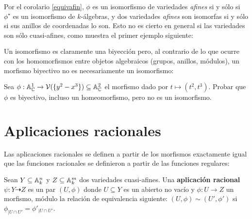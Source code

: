 \documentclass[ACGA.tex]{subfiles}
\begin{document}
 Por el corolario \ref{equivafin}, $\phi$ es un isomorfismo de variedades \emph{afines} si y sólo si $\phi^\star$ es un isomorfismo de $k$-álgebras, y dos variedades \emph{afines} son isomorfas si y sólo si sus anillos de coordenadas lo son. Esto no es cierto en general si las variedades son sólo cuasi-afines, como muestra el primer ejemplo siguiente:


Un isomorfismo es claramente una biyección pero, al contrario de lo que ocurre con los homomorfismos entre objetos algebraicos (grupos, anillos, módulos), un morfismo biyectivo no es necesariamente un isomorfismo:

\begin{ejer}
 Sea $\phi:\mathbb{A}^1_{\mathbb{C}}\to\mathcal{V}(\{y^2-x^3\})\subseteq\mathbb{A}^2_{\mathbb{C}}$ el morfismo dado por $t\mapsto (t^2,t^3)$. Probar que $\phi$ es biyectivo, incluso un homeomorfismo, pero no es un isomorfismo.
\end{ejer}

\section{Aplicaciones racionales}

Las aplicaciones racionales se definen a partir de los morfismos exactamente igual que las funciones racionales se definieron a partir de las funciones regulares:

\begin{defi}
 Sean $Y\subseteq\mathbb{A}^n_k$ y $Z\subseteq\mathbb{A}^m_k$ dos variedades cuasi-afines. Una {\bf aplicación racional} $\psi:Y\dashrightarrow Z$ es un par $(U,\phi)$ donde $U\subseteq Y$ es un abierto no vacío y $\phi:U\to Z$ un morfismo, módulo la relación de equivalencia siguiente: $(U,\phi)\sim(U',\phi')$ si $\phi_{|U\cap U'}=\phi'_{|U\cap U'}$.
\end{defi}
\end{document}
